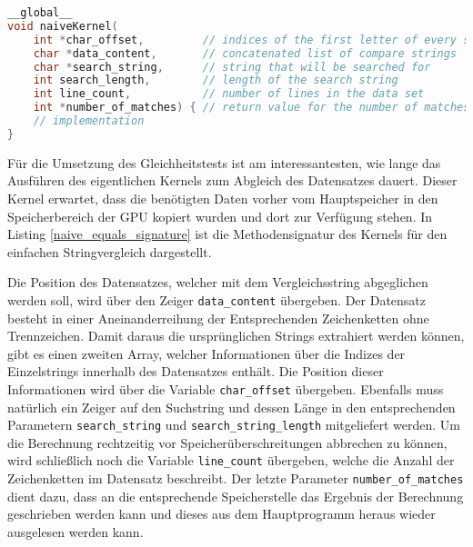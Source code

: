 \newpage

\begin{lstlisting}[language=C++,
caption=Methodensignatur des Kernels,
label=naive_equals_signature]
__global__
void naiveKernel(
	int *char_offset,         // indices of the first letter of every string
	char *data_content,       // concatenated list of compare strings 
	char *search_string,      // string that will be searched for
	int search_length,        // length of the search string
	int line_count,           // number of lines in the data set
	int *number_of_matches) { // return value for the number of matches
	// implementation
}
\end{lstlisting}

Für die Umsetzung des Gleichheitstests ist am interessantesten, wie lange das Ausführen des eigentlichen Kernels zum Abgleich des Datensatzes dauert.
Dieser Kernel erwartet, dass die benötigten Daten vorher vom Hauptspeicher in den Speicherbereich der GPU kopiert wurden und dort zur Verfügung stehen.
In Listing \ref{naive_equals_signature} ist die Methodensignatur des Kernels für den einfachen Stringvergleich dargestellt.

Die Position des Datensatzes, welcher mit dem Vergleichsstring abgeglichen werden soll, wird über den Zeiger \texttt{data\_content} übergeben.
Der Datensatz besteht in einer Aneinanderreihung der Entsprechenden Zeichenketten ohne Trennzeichen.
Damit daraus die ursprünglichen Strings extrahiert werden können, gibt es einen zweiten Array, welcher Informationen über die Indizes der Einzelstrings innerhalb des Datensatzes enthält.
Die Position dieser Informationen wird über die Variable \texttt{char\_offset} übergeben.
Ebenfalls muss natürlich ein Zeiger auf den Suchstring und dessen Länge in den entsprechenden Parametern \texttt{search\_string} und \texttt{search\_string\_length} mitgeliefert werden.
Um die Berechnung rechtzeitig vor Speicherüberschreitungen abbrechen zu können, wird schließlich noch die Variable \texttt{line\_count} übergeben, welche die Anzahl der Zeichenketten im Datensatz beschreibt.
Der letzte Parameter \texttt{number\_of\_matches} dient dazu, dass an die entsprechende Speicherstelle das Ergebnis der Berechnung geschrieben werden kann und dieses aus dem Hauptprogramm heraus wieder ausgelesen werden kann.

\newpage


